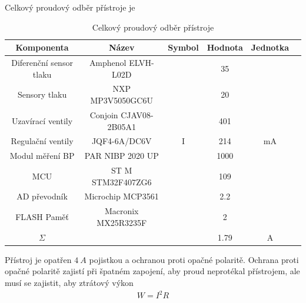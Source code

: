 Celkový proudový odběr přístroje je
\begin{table}[H]
    \label{tab:sum_of_current}
    \caption{Celkový proudový odběr přístroje}
    \centering
    \begin{ctucolortab}
        \begin{tabular}{cccccc}
            \toprule
            Komponenta              & Název                 & Symbol & Hodnota & Jednotka \\ \midrule
            Diferenční sensor tlaku & Amphenol ELVH-L02D    &        & 35      &          \\
            Sensory tlaku           & NXP MP3V5050GC6U      &        & 20      &          \\
            Uzavírací ventily       & Conjoin CJAV08-2B05A1 &        & 401     &          \\
            Regulační ventily       & JQF4-6A/DC6V          & I      & 214     & mA       \\
            Modul měření BP         & PAR NIBP 2020 UP      &        & 1000    &          \\
            MCU                     & ST M STM32F407ZG6     &        & 109     &          \\
            AD převodník            & Microchip MCP3561     &        & 2.2     &          \\
            FLASH Paměť             & Macronix MX25R3235F   &        & 2       &          \\
            \bottomrule
            $\Sigma$                &                       &        & 1.79    & A        \\
            \bottomrule
        \end{tabular}
    \end{ctucolortab}
\end{table}

Přístroj je opatřen $4 \ A$ pojistkou a ochranou proti opačné polaritě.
Ochrana proti opačné polaritě zajistí při špatném zapojení, aby proud neprotékal přístrojem, ale musí se zajistit, aby ztrátový výkon
\begin{align*}
    W = I^2 R
\end{align*}

